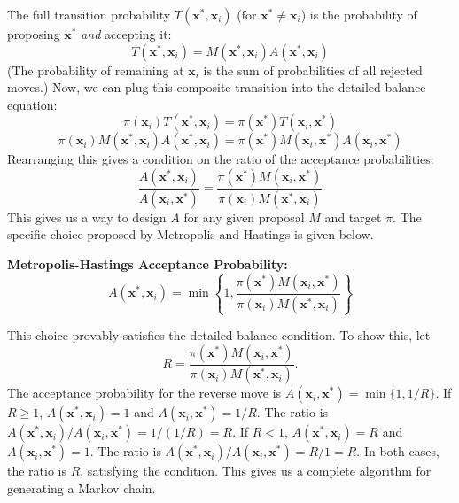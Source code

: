 The full transition probability $T(\mathbf{x}^*, \mathbf{x}_i)$ (for $\mathbf{x}^* \neq \mathbf{x}_i$) is the probability of proposing $\mathbf{x}^*$ \emph{and} accepting it:
\begin{equation}
    T(\mathbf{x}^*, \mathbf{x}_i) = M(\mathbf{x}^*, \mathbf{x}_i) A(\mathbf{x}^*, \mathbf{x}_i)
\end{equation}
(The probability of remaining at $\mathbf{x}_i$ is the sum of probabilities of all rejected moves.) Now, we can plug this composite transition into the detailed balance equation:
\begin{equation}
    \pi(\mathbf{x}_i) T(\mathbf{x}^*, \mathbf{x}_i) = \pi(\mathbf{x}^*) T(\mathbf{x}_i, \mathbf{x}^*)
\end{equation}
\begin{equation}
    \pi(\mathbf{x}_i) M(\mathbf{x}^*, \mathbf{x}_i) A(\mathbf{x}^*, \mathbf{x}_i) = \pi(\mathbf{x}^*) M(\mathbf{x}_i, \mathbf{x}^*) A(\mathbf{x}_i, \mathbf{x}^*)
\end{equation}
Rearranging this gives a condition on the ratio of the acceptance probabilities:
\begin{equation}
    \frac{A(\mathbf{x}^*, \mathbf{x}_i)}{A(\mathbf{x}_i, \mathbf{x}^*)} = \frac{\pi(\mathbf{x}^*) M(\mathbf{x}_i, \mathbf{x}^*)}{\pi(\mathbf{x}_i) M(\mathbf{x}^*, \mathbf{x}_i)}
\end{equation}
This gives us a way to design $A$ for any given proposal $M$ and target $\pi$. The specific choice proposed by Metropolis and Hastings is given below.
\begin{definitionBox}
    \textbf{Metropolis-Hastings Acceptance Probability:}
    \begin{equation}
        A(\mathbf{x}^*, \mathbf{x}_i) = \min \left\{ 1, \frac{\pi(\mathbf{x}^*) M(\mathbf{x}_i, \mathbf{x}^*)}{\pi(\mathbf{x}_i) M(\mathbf{x}^*, \mathbf{x}_i)} \right\}
    \end{equation}
\end{definitionBox}
This choice provably satisfies the detailed balance condition. To show this, let
\[
R = \frac{\pi(\mathbf{x}^*) M(\mathbf{x}_i, \mathbf{x}^*)}{\pi(\mathbf{x}_i) M(\mathbf{x}^*, \mathbf{x}_i)}.
\]
The acceptance probability for the reverse move is $A(\mathbf{x}_i, \mathbf{x}^*) = \min\{1, 1/R\}$. If $R \geq 1$, $A(\mathbf{x}^*, \mathbf{x}_i) = 1$ and $A(\mathbf{x}_i, \mathbf{x}^*) = 1/R$. The ratio is $A(\mathbf{x}^*, \mathbf{x}_i) / A(\mathbf{x}_i, \mathbf{x}^*) = 1 / (1/R) = R$. If $R < 1$, $A(\mathbf{x}^*, \mathbf{x}_i) = R$ and $A(\mathbf{x}_i, \mathbf{x}^*) = 1$. The ratio is $A(\mathbf{x}^*, \mathbf{x}_i) / A(\mathbf{x}_i, \mathbf{x}^*) = R / 1 = R$. In both cases, the ratio is $R$, satisfying the condition. This gives us a complete algorithm for generating a Markov chain.

